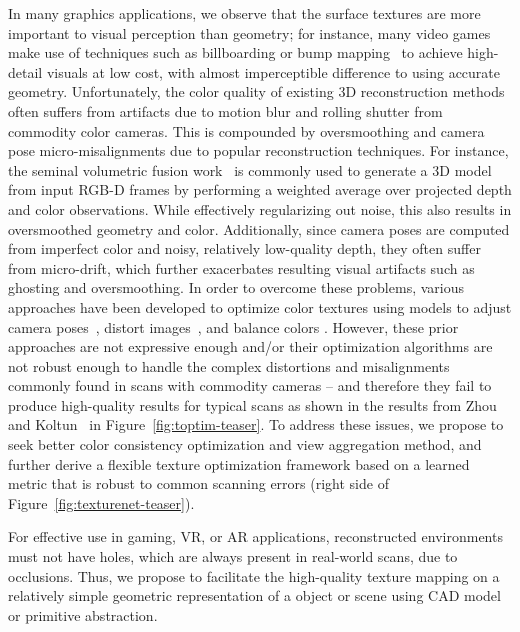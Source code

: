 In many graphics applications, we observe that the surface textures are more important to visual perception than geometry; for instance, many video games make use of techniques such as billboarding or bump mapping~\cite{decoret1999multi}
to achieve high-detail visuals at low cost, with almost imperceptible difference to using accurate geometry.
Unfortunately, the color quality of existing 3D reconstruction methods often suffers from artifacts due to motion blur and rolling shutter from commodity color cameras. 
This is compounded by oversmoothing and camera pose micro-misalignments due to popular reconstruction techniques.
For instance, the seminal volumetric fusion work~\cite{curless1996volumetric} is commonly used to generate a 3D model from input RGB-D frames by performing a weighted average over projected depth and color observations.
While effectively regularizing out noise, this also results in oversmoothed geometry and color.
Additionally, since camera poses are computed from imperfect color and noisy, relatively low-quality depth, they often suffer from micro-drift, which further exacerbates resulting visual artifacts such as ghosting and oversmoothing. In order to overcome these problems, various approaches have been developed to optimize color textures using models to adjust camera poses~\cite{zhou2014color}, distort images~\cite{bi2017patch,zhou2014color}, and balance colors \cite{zhou2014color}.  However, these prior approaches are not expressive enough and/or their optimization algorithms are not robust enough to handle the complex distortions and misalignments commonly found in scans with commodity cameras -- and therefore they fail to produce high-quality results for typical scans as shown in the results from Zhou and Koltun~\cite{zhou2014color} in Figure~\ref{fig:toptim-teaser}.
 To address these issues, we propose to seek better color consistency optimization and view aggregation method, and further derive a flexible texture optimization framework based on a learned metric that is robust to common scanning errors (right side of Figure~\ref{fig:texturenet-teaser}).

For effective use in gaming, VR, or AR applications, reconstructed environments must not have holes, which are always present in real-world scans, due to occlusions.
Thus, we propose to facilitate the high-quality texture mapping on a relatively simple geometric representation of a object or scene using CAD model or primitive abstraction.

